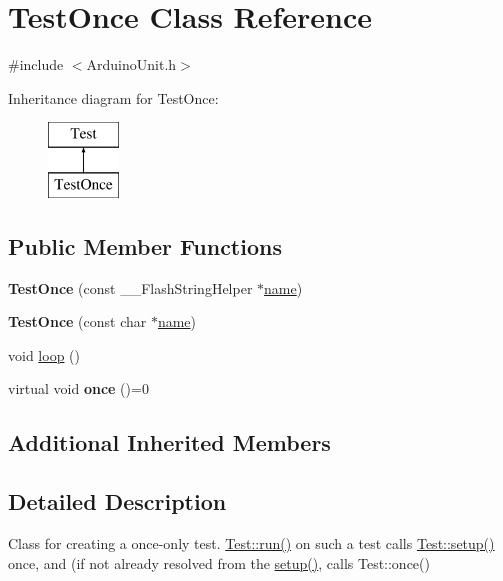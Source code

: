 \hypertarget{class_test_once}{\section{Test\-Once Class Reference}
\label{class_test_once}
}


{\ttfamily \#include $<$Arduino\-Unit.\-h$>$}

Inheritance diagram for Test\-Once\-:\begin{figure}[H]
\begin{center}
\leavevmode
\includegraphics[height=2.000000cm]{class_test_once}
\end{center}
\end{figure}
\subsection*{Public Member Functions}
\begin{DoxyCompactItemize}
\item 
\hypertarget{class_test_once_ab6d791fc4d2a1c3c1d2179de6951fd04}{{\bfseries Test\-Once} (const \-\_\-\-\_\-\-Flash\-String\-Helper $\ast$\hyperlink{class_test_acff24a84a14b606d01913a4a701ca821}{name})}\label{class_test_once_ab6d791fc4d2a1c3c1d2179de6951fd04}

\item 
\hypertarget{class_test_once_acf663e322d003b71cebd11c55115065f}{{\bfseries Test\-Once} (const char $\ast$\hyperlink{class_test_acff24a84a14b606d01913a4a701ca821}{name})}\label{class_test_once_acf663e322d003b71cebd11c55115065f}

\item 
void \hyperlink{class_test_once_a602e32762fb5bf103bb1371a3dc12eed}{loop} ()
\item 
\hypertarget{class_test_once_a02102ad4247993c367b1e969119220aa}{virtual void {\bfseries once} ()=0}\label{class_test_once_a02102ad4247993c367b1e969119220aa}

\end{DoxyCompactItemize}
\subsection*{Additional Inherited Members}


\subsection{Detailed Description}
Class for creating a once-\/only test. \hyperlink{class_test_abb64a8b970de8b2422b9f56cd8719ca4}{Test\-::run()} on such a test calls \hyperlink{class_test_a5eed880dda5138db9b40c6a8c3e6b3c3}{Test\-::setup()} once, and (if not already resolved from the \hyperlink{class_test_a5eed880dda5138db9b40c6a8c3e6b3c3}{setup()}, calls Test\-::once() 

